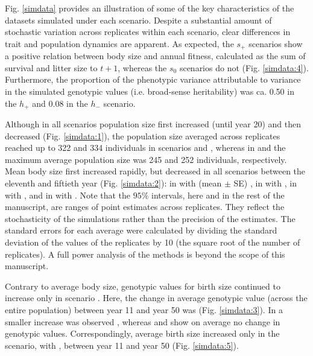 Fig. \ref{simdata} provides an illustration of some of the key characteristics of the datasets simulated under each scenario. Despite a substantial amount of stochastic variation across replicates within each scenario, clear differences in trait and population dynamics are apparent. As expected, the $s_+$ scenarios show a positive relation between body size and annual fitness, calculated as the sum of survival and litter size to $t+1$, whereas the $s_0$ scenarios do not (Fig. \ref{simdata:4}). Furthermore, the proportion of the phenotypic variance attributable to variance in the simulated genotypic values (i.e. broad-sense heritability) was ca. 0.50 in the $h_+$ and 0.08 in the $h_-$ scenario.

Although in all scenarios population size first increased (until year 20) and then decreased (Fig. \ref{simdata:1}), the  population size averaged across replicates reached up to 322 and 334 individuals in scenarios \Sh and \SH, whereas in \sh and \sH the maximum average population size was 245 and 252 individuals, respectively. Mean body size first increased rapidly, but decreased in all scenarios between the eleventh and fiftieth year (Fig. \ref{simdata:2}): in \sh with (mean $\pm$ SE) , in \sH with , in \Sh with , and in \SH with . Note that the $95\%$ intervals, here and in the rest of the manuscript, are ranges of point estimates across replicates. They reflect the stochasticity of the simulations rather than the precision of the estimates. The standard errors for each average were calculated by dividing the standard deviation of the values of the replicates by 10 (the square root of the number of replicates). A full power analysis of the methods is beyond the scope of this manuscript.

Contrary to average body size, genotypic values for birth size continued to increase only in scenario \SH. Here, the change in average genotypic value (across the entire population) between year 11 and year 50 was  (Fig. \ref{simdata:3}). In \Sh a smaller increase was observed , whereas \sh and \sH show on average no change in genotypic values. Correspondingly, average birth size increased only in the \SH scenario, with , between year 11 and year 50 (Fig. \ref{simdata:5}). 



